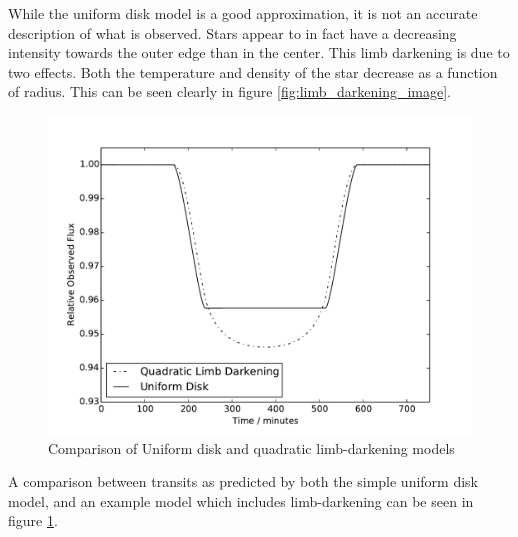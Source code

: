 While the uniform disk model is a good approximation, it is not an accurate description of what is observed. Stars appear to in fact have a decreasing intensity towards the outer edge than in the center. This limb darkening is due to two effects. Both the temperature and density of the star decrease as a function of radius. This can be seen clearly in figure \ref{fig:limb_darkening_image}.
\begin{figure}
    \centering
    \includegraphics[width=\figwidth]{images/model_comparison.pdf}
    \caption{Comparison of Uniform disk and quadratic limb-darkening models}
    \label{fig:model_comparison}
\end{figure}

A comparison between transits as predicted by both the simple uniform disk model, and an example model which includes limb-darkening can be seen in figure \ref{fig:model_comparison}.
